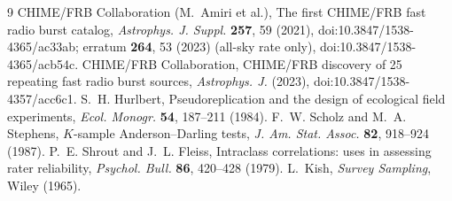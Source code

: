 \documentclass[11pt]{article}
\begin{document}
\begin{thebibliography}{9}
 CHIME/FRB Collaboration (M.~Amiri et al.), The first CHIME/FRB fast radio burst catalog,
\emph{Astrophys. J. Suppl.} \textbf{257}, 59 (2021), doi:10.3847/1538-4365/ac33ab; erratum \textbf{264}, 53 (2023)
(all-sky rate only), doi:10.3847/1538-4365/acb54c.
 CHIME/FRB Collaboration, CHIME/FRB discovery of 25 repeating fast radio burst sources,
\emph{Astrophys. J.} (2023), doi:10.3847/1538-4357/acc6c1.
 S.~H. Hurlbert, Pseudoreplication and the design of ecological field experiments,
\emph{Ecol. Monogr.} \textbf{54}, 187--211 (1984).
 F.~W. Scholz and M.~A. Stephens, $K$-sample Anderson--Darling tests,
\emph{J. Am. Stat. Assoc.} \textbf{82}, 918--924 (1987).
 P.~E. Shrout and J.~L. Fleiss, Intraclass correlations: uses in assessing rater reliability,
\emph{Psychol. Bull.} \textbf{86}, 420--428 (1979).
 L.~Kish, \emph{Survey Sampling}, Wiley (1965).
\end{thebibliography}
\end{document}
